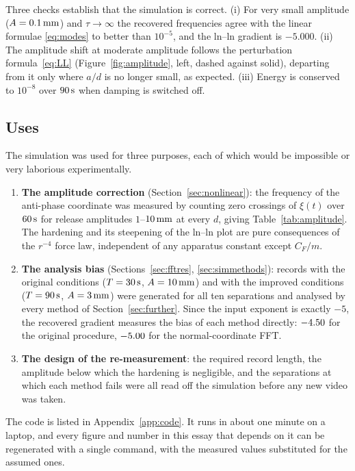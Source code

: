 Three checks establish that the simulation is correct. (i) For very small amplitude ($A=0.1\,\mathrm{mm}$) and $\tau\to\infty$ the recovered frequencies agree with the linear formulae \eqref{eq:modes} to better than $10^{-5}$, and the ln--ln gradient is $-5.000$. (ii) The amplitude shift at moderate amplitude follows the perturbation formula~\eqref{eq:LL} (Figure~\ref{fig:amplitude}, left, dashed against solid), departing from it only where $a/d$ is no longer small, as expected. (iii) Energy is conserved to $10^{-8}$ over $90\,\mathrm{s}$ when damping is switched off.

\subsection{Uses}

The simulation was used for three purposes, each of which would be impossible or very laborious experimentally.
\begin{enumerate}
\item \textbf{The amplitude correction} (Section~\ref{sec:nonlinear}): the frequency of the anti-phase coordinate was measured by counting zero crossings of $\xi(t)$ over $60\,\mathrm{s}$ for release amplitudes $1$--$10\,\mathrm{mm}$ at every $d$, giving Table~\ref{tab:amplitude}. The hardening and its steepening of the ln--ln plot are pure consequences of the $r^{-4}$ force law, independent of any apparatus constant except $C_F/m$.
\item \textbf{The analysis bias} (Sections~\ref{sec:fftres}, \ref{sec:simmethods}): records with the original conditions ($T=30\,\mathrm{s}$, $A=10\,\mathrm{mm}$) and with the improved conditions ($T=90\,\mathrm{s}$, $A=3\,\mathrm{mm}$) were generated for all ten separations and analysed by every method of Section~\ref{sec:further}. Since the input exponent is exactly $-5$, the recovered gradient measures the bias of each method directly: $-4.50$ for the original procedure, $-5.00$ for the normal-coordinate FFT.
\item \textbf{The design of the re-measurement}: the required record length, the amplitude below which the hardening is negligible, and the separations at which each method fails were all read off the simulation before any new video was taken.
\end{enumerate}

The code is listed in Appendix~\ref{app:code}. It runs in about one minute on a laptop, and every figure and number in this essay that depends on it can be regenerated with a single command, with the measured values substituted for the assumed ones.
